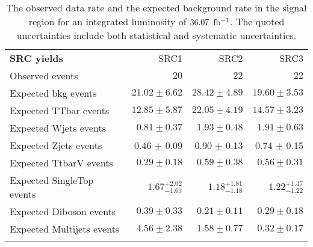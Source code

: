 

\begin{table}[!h]
\caption{The observed data rate and the expected background rate in the signal region for an integrated luminosity of $36.07$ $\mbox{fb$^{-1}$}$. The quoted uncertainties include both statistical and systematic uncertainties.
}
\label{table.bkgonly.SRC1to3}
\begin{center}
\setlength{\tabcolsep}{0.0pc}
{\small
\begin{tabular*}{\textwidth}{@{\extracolsep{\fill}}lrrr}
\noalign{\smallskip}\hline\noalign{\smallskip}
{\bf SRC yields}           & SRC1            & SRC2            & SRC3              \\[-0.05cm]
\noalign{\smallskip}\hline\noalign{\smallskip}
Observed events          & $20$              & $22$              & $22$                    \\
\noalign{\smallskip}\hline\noalign{\smallskip}
Expected bkg events         & $21.02 \pm 6.62$          & $28.42 \pm 4.89$          & $19.60 \pm 3.53$              \\
\noalign{\smallskip}\hline\noalign{\smallskip}
        Expected TTbar events         & $12.85 \pm 5.87$          & $22.05 \pm 4.19$          & $14.57 \pm 3.23$              \\
        Expected Wjets events         & $0.81 \pm 0.37$          & $1.93 \pm 0.48$          & $1.91 \pm 0.63$              \\
        Expected Zjets events         & 0.46 $\pm$ 0.09          & 0.90 $\pm$ 0.13          &  0.74 $\pm$ 0.15               \\
        Expected TtbarV events         & $0.29 \pm 0.18$          & $0.59 \pm 0.38$          & $0.56 \pm 0.31$              \\
        Expected SingleTop events         & $1.67_{-1.67}^{+2.02}$          & $1.18_{-1.18}^{+1.81}$          & $1.22_{-1.22}^{+1.37}$              \\
        Expected Diboson events         & $0.39 \pm 0.33$          & $0.21 \pm 0.11$          & $0.29 \pm 0.18$              \\
        Expected Multijets events         & $4.56 \pm 2.38$          & $1.58 \pm 0.77$          & $0.32 \pm 0.17$              \\
 \noalign{\smallskip}\hline\noalign{\smallskip}

\end{tabular*}

}
\end{center}
\end{table}
